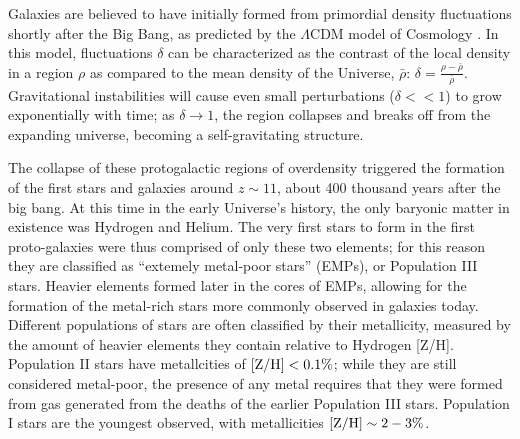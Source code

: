 Galaxies are believed to have initially formed from primordial density fluctuations shortly after the Big Bang, as predicted by the $\Lambda$CDM model of Cosmology \citep{Peebles1994,Ryden2006,Conselice2012,Silk2013}. In this model, fluctuations $\delta$ can be characterized as the contrast of the local density in a region $\rho$ as compared to the mean density of the Universe, $\bar{\rho}$: $\delta = \frac{\rho - \bar{\rho}}{\bar{\rho}}$. Gravitational instabilities will cause even small perturbations ($\delta<<1$) to grow exponentially with time; as $\delta \rightarrow 1$, the region collapses and breaks off from the expanding universe, becoming a self-gravitating structure.

The collapse of these protogalactic regions of overdensity triggered the formation of the first stars and galaxies around $z\sim11$, about 400 thousand years after the big bang. At this time in the early Universe's history, the only baryonic matter in existence was Hydrogen and Helium. The very first stars to form in the first proto-galaxies were thus comprised of only these two elements; for this reason they are classified as ``extemely metal-poor stars'' (EMPs), or Population III stars. Heavier elements formed later in the cores of EMPs, allowing for the formation of the metal-rich stars more commonly observed in galaxies today. Different populations of stars are often classified by their metallicity, measured by the amount of heavier elements they contain relative to Hydrogen [Z/H]. Population II stars have metallcities of $\rm [Z/H] < 0.1 \%$; while they are still considered metal-poor, the presence of any metal requires that they were formed from gas generated from the deaths of the earlier Population III stars. Population I stars are the youngest observed, with metallicities $\rm [Z/H] \sim 2-3\%$. 

